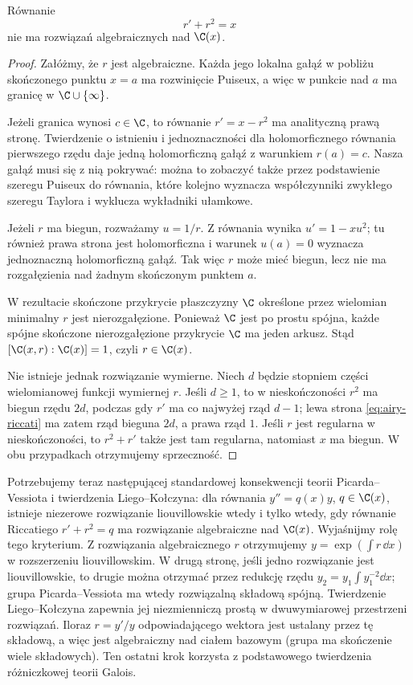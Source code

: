 \begin{lemat}
Równanie
\begin{equation}\label{eq:airy-riccati}
r'+r^2=x
\end{equation}
nie ma rozwiązań algebraicznych nad $\C(x)$.
\end{lemat}
\begin{proof}
Załóżmy, że $r$ jest algebraiczne. Każda jego lokalna gałąź w pobliżu skończonego punktu $x=a$ ma rozwinięcie Puiseux, a więc w punkcie nad $a$ ma granicę w $\C\cup\{\infty\}$.

Jeżeli granica wynosi $c\in\C$, to równanie $r'=x-r^2$ ma analityczną prawą stronę. Twierdzenie o istnieniu i jednoznaczności dla holomorficznego równania pierwszego rzędu daje jedną holomorficzną gałąź z warunkiem $r(a)=c$. Nasza gałąź musi się z nią pokrywać: można to zobaczyć także przez podstawienie szeregu Puiseux do równania, które kolejno wyznacza współczynniki zwykłego szeregu Taylora i wyklucza wykładniki ułamkowe.

Jeżeli $r$ ma biegun, rozważamy $u=1/r$. Z równania wynika $u'=1-xu^2$; tu również prawa strona jest holomorficzna i warunek $u(a)=0$ wyznacza jednoznaczną holomorficzną gałąź. Tak więc $r$ może mieć biegun, lecz nie ma rozgałęzienia nad żadnym skończonym punktem $a$.

W rezultacie skończone przykrycie płaszczyzny $\C$ określone przez wielomian minimalny $r$ jest nierozgałęzione. Ponieważ $\C$ jest po prostu spójna, każde spójne skończone nierozgałęzione przykrycie $\C$ ma jeden arkusz. Stąd $[\C(x,r):\C(x)]=1$, czyli $r\in\C(x)$.

Nie istnieje jednak rozwiązanie wymierne. Niech $d$ będzie stopniem części wielomianowej funkcji wymiernej $r$. Jeśli $d\ge1$, to w nieskończoności $r^2$ ma biegun rzędu $2d$, podczas gdy $r'$ ma co najwyżej rząd $d-1$; lewa strona \eqref{eq:airy-riccati} ma zatem rząd bieguna $2d$, a prawa rząd $1$. Jeśli $r$ jest regularna w nieskończoności, to $r^2+r'$ także jest tam regularna, natomiast $x$ ma biegun. W obu przypadkach otrzymujemy sprzeczność.
\end{proof}

Potrzebujemy teraz następującej standardowej konsekwencji teorii Picarda--Vessiota i twierdzenia Liego--Kołczyna: dla równania $y''=q(x)y$, $q\in\C(x)$, istnieje niezerowe rozwiązanie liouvillowskie wtedy i tylko wtedy, gdy równanie Riccatiego $r'+r^2=q$ ma rozwiązanie algebraiczne nad $\C(x)$. Wyjaśnijmy rolę tego kryterium. Z rozwiązania algebraicznego $r$ otrzymujemy $y=\exp(\int r\,\dd x)$ w rozszerzeniu liouvillowskim. W drugą stronę, jeśli jedno rozwiązanie jest liouvillowskie, to drugie można otrzymać przez redukcję rzędu $y_2=y_1\int y_1^{-2}\dd x$; grupa Picarda--Vessiota ma wtedy rozwiązalną składową spójną. Twierdzenie Liego--Kołczyna zapewnia jej niezmienniczą prostą w dwuwymiarowej przestrzeni rozwiązań. Iloraz $r=y'/y$ odpowiadającego wektora jest ustalany przez tę składową, a więc jest algebraiczny nad ciałem bazowym (grupa ma skończenie wiele składowych). Ten ostatni krok korzysta z podstawowego twierdzenia różniczkowej teorii Galois.

